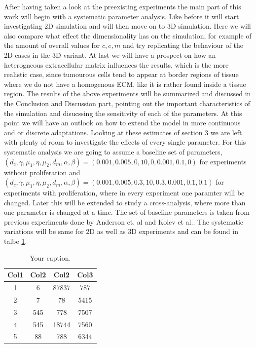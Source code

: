 After having taken a look at the preexisting experiments the main part of this work will begin with a systematic parameter analysis. Like before it will start investigating 2D simulation and will then move on to 3D simulation. Here we will also compare what effect the dimensionality has on the simulation, for example of the amount of overall values for $c,e,m$ and try replicating the behaviour of the 2D cases in the 3D variant. \newline
At last we will have a prospect on how an heterogneous extracellular matrix influences the results, which is the more realistic case, since tumourous cells tend to appear at border regions of tissue where we do not have a homogenous ECM, like it is rather found inside a tissue region. \newline
The results of the above experiments will be summarized and discussed in the Conclusion and Discussion part, pointing out the important characteristics of the simulation and disucssing the sensitivity of each of the parameters. At this point we will have an outlook on how to extend the model in more continuous and or discrete adaptations.
Looking at these estimates of section 3 we are left with plenty of room to investigate the effects of every single parameter. For this systematic analysis we are going to assume a baseline set of parameters, $(d_c, \gamma, \mu_1, \eta, \mu_2, d_m, \alpha, \beta) = (0.001, 0.005, 0, 10, 0, 0.001,0.1, 0)$ for experiments without proliferation and \newline
$(d_c, \gamma, \mu_1, \eta, \mu_2, d_m, \alpha, \beta) = (0.001, 0.005, 0.3, 10, 0.3, 0.001,0.1, 0.1)$ for experiments with proliferation, where in every experiment one paramter will be changed. Later this will be extended to study a cross-analysis, where more than one parameter is changed at a time. The set of baseline parameters is taken from previous experiments done by Anderson et. al \cite{anderson_mathematical_2000} and Kolev et al.\cite{Kolev2010}. The systematic variations will be same for 2D as well as 3D experiments and can be found in talbe \ref{tab:systematic_analysis}.

\begin{table}[!h]
    \begin{center}
        \label{tab:systematic_analysis}
        \begin{tabular}{||c c c c||} 
            \hline
            Col1 & Col2 & Col2 & Col3 \\ [0.5ex] 
            \hline\hline
            1 & 6 & 87837 & 787 \\ 
            \hline
            2 & 7 & 78 & 5415 \\
            \hline
            3 & 545 & 778 & 7507 \\
            \hline
            4 & 545 & 18744 & 7560 \\
            \hline
            5 & 88 & 788 & 6344 \\ [1ex] 
            \hline
        \end{tabular}
        \caption{Your caption.}
    \end{center}
\end{table}


